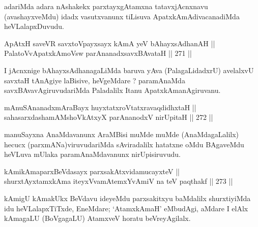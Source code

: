 \begin{artha}
adariMda adara nAshakekx parxtayxgAtamxna tatavxjAcnxnavu
(avashayxveMdu) idadx vasutxvanunx tiLisuva ApatxkAmAdivacanadiMda heVLalapxDuvudu.
\end{artha}


\begin{shl}
ApAtxH saveVR savxtoV\s payxsayx kAmA yeV bAhayxsAdhanAH || \\
PalatoV\s vApatxkAmoV\s sw parAnanadxsavxBAvataH \hfill || 271 ||  
\end{shl}

\begin{artha}
I jAcnxnige bAhayxsAdhanagaLiMda baruva yAva (PalagaLidadxrU)
avelalxvU savxtaH tAnAgiye laBisive, heVgeMdare  ? paramAnaMda
savxBAvavAgiruvudariMda Paladalilx Itanu ApatxkAmanAgiruvanu.
\end{artha}


\begin{shl}
mAnuSAnanadxmAraBayx huyxtatxroVtatxravaqdidhxtaH || \\
sahasarxdashamAMshoVkAtxyX parAnanodxV nirUpitaH \hfill || 272 ||  
\end{shl}

\begin{artha}
manuSayxna AnaMdavanunx AraMBisi muMde muMde (AnaMdagaLalilx) hecucx
(parxmANa)viruvudariMda sAviradalilx hatatxne oMdu BAgaveMdu heVLuva
mUlaka paramAnaMdavanunx nirUpisiruvudu.
\end{artha}


\begin{shl}
kAmikAmaparxBeVdasayx parxsakAtxvidamucayxteV || \\
shurxtAyx\s \s tamxkAma iteyxVvamAtemxYvAmiV na teV paqthakf \hfill || 273 ||  
\end{shl}

\begin{artha}
kAmigU kAmakUkx BeVdavu ideyeMdu parxsakitxyu baMdalilx shurxtiyiMda
idu heVLalapxTiTxde, EneMdare; `AtamxkAmaH' eMbudAgi, aMdare I elAlx
kAmagaLU (BoVgagaLU) AtamxveV horatu beVreyAgilalx.
\end{artha}


